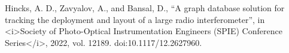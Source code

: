 \documentclass[apj]{emulateapj}
\begin{document}


 


Hincks, A. D., Zavyalov, A., and Bansal, D., “A graph database solution for tracking the deployment and layout of a large radio interferometer”, in <i>Society of Photo-Optical Instrumentation Engineers (SPIE) Conference Series</i>, 2022, vol. 12189. doi:10.1117/12.2627960.
\end{document}
